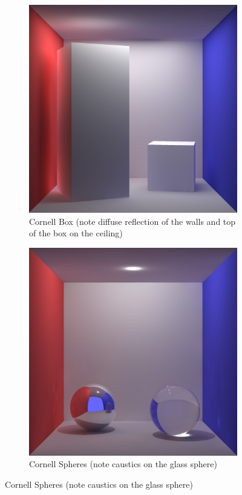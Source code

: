 \begin{figure}
\centering
	\begin{subfigure}[b]{0.6\textwidth}
		\includegraphics[width=\textwidth]{./images/renders/box.png}
		\caption{Cornell Box (note diffuse reflection of the walls and top of the box on the ceiling)}
	\end{subfigure}
	\begin{subfigure}[b]{0.6\textwidth}
	\includegraphics[width=\textwidth]{./images/renders/cornell_box.png}
	\caption{Cornell Spheres (note caustics on the glass sphere)}
	\end{subfigure}
\end{figure}

